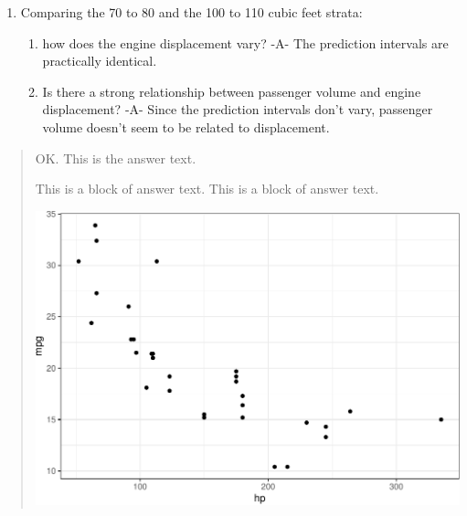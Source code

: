 \documentclass[]{article}
\providecommand{\tightlist}{%
  \setlength{\itemsep}{0pt}\setlength{\parskip}{0pt}}
\begin{document}
\begin{enumerate}
\def\labelenumi{\arabic{enumi}.}
\setcounter{enumi}{1}
\tightlist
\item
  Comparing the 70 to 80 and the 100 to 110 cubic feet strata:

  \begin{enumerate}
  \def\labelenumii{\alph{enumii}.}
  \tightlist
  \item
    how does the engine displacement vary? -A- The prediction intervals
    are practically identical.
  \item
    Is there a strong relationship between passenger volume and engine
    displacement? -A- Since the prediction intervals don't vary,
    passenger volume doesn't seem to be related to displacement.
  \end{enumerate}
\end{enumerate}

\begin{quotation}\em

OK. This is the answer text.

This is a block of answer text. This is a block of answer text.

\includegraphics[width=0.8\linewidth]{beech-run-mug_files/figure-latex/unnamed-chunk-1-1}
\end{quotation}
\end{document}
